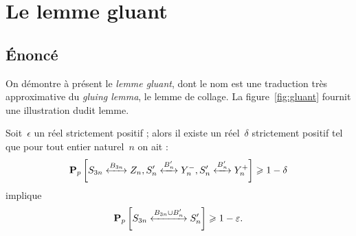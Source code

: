 \section{Le lemme gluant}
	\subsection{Énoncé}
		On démontre à présent le \emph{lemme gluant}, dont le nom est une traduction très approximative du \emph{gluing lemma}, le lemme de collage. La figure~\ref{fig:gluant} fournit une illustration dudit lemme.
			
		\begin{lem}\label{lem:gluant}
			Soit~$\epsilon$ un réel strictement positif ; alors il existe un réel~$\delta$ strictement positif tel que pour tout entier naturel~$n$ on ait :
			\[
				\Pp{\relie[B_{3n}]{S_{3n}}{Z_n},
					\relie[B_n']{S_n'}{Y_n^-},
					\relie[B_n']{S_n'}{Y_n^+}}
				\geq 1 - \delta
			\]
			implique
			\[
				\Pp{\relie[B_{3n}\cup B_n']{S_{3n}}{S_n'}}
				\geq 1 - \epsilon.
			\]
		\end{lem}
